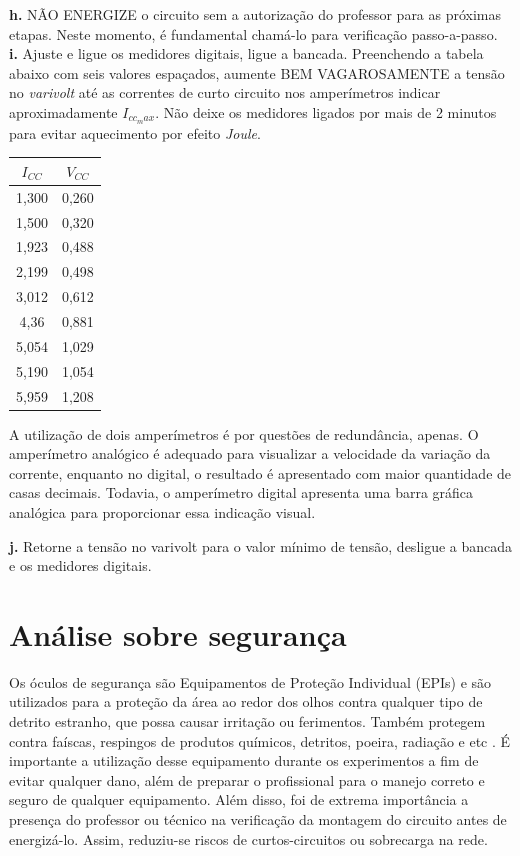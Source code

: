 \documentclass[a4paper,12pt,oneside,openany,table,xcdraw]{article}
\begin{document}
\noindent\textbf{h.} NÃO ENERGIZE o circuito sem a autorização do professor para as próximas etapas. Neste momento, é fundamental chamá-lo para verificação passo-a-passo. \\
\textbf{i.} Ajuste e ligue os medidores digitais, ligue a bancada. Preenchendo a tabela abaixo com seis valores espaçados, aumente BEM VAGAROSAMENTE a tensão no \textit{varivolt} até as correntes de curto circuito nos amperímetros indicar aproximadamente $I_{cc_max}$. Não deixe os medidores ligados por mais de 2 minutos para evitar aquecimento por efeito \textit{Joule}.  \\

\begin{table}[H]\scriptsize
\centering
\def\arraystretch{1.35}
\captionsetup{font=scriptsize}
 \label{tab2}
\begin{tabular}{|c|c|}
\hline
$I_{CC}$ & $V_{CC}$ \\ \hline
1,300    & 0,260    \\ \hline
1,500    & 0,320    \\ \hline
1,923    & 0,488    \\ \hline
2,199    & 0,498    \\ \hline
3,012    & 0,612    \\ \hline
4,36     & 0,881    \\ \hline
5,054    & 1,029    \\ \hline
5,190    & 1,054    \\ \hline
5,959    & 1,208    \\ \hline
\end{tabular}
\end{table}

A utilização de dois amperímetros é por questões de redundância, apenas. O amperímetro analógico é adequado para visualizar a velocidade da variação da corrente, enquanto no digital, o resultado é apresentado com maior quantidade de casas decimais. Todavia, o amperímetro digital apresenta uma barra gráfica analógica para proporcionar essa indicação visual. 

\noindent\textbf{j.} Retorne a tensão no varivolt para o valor mínimo de tensão, desligue a bancada e os medidores digitais.\\

\section{Análise sobre segurança} %
Os óculos de segurança são Equipamentos de Proteção Individual (EPIs) e são utilizados para a proteção da área ao redor dos olhos contra qualquer tipo de detrito estranho, que possa causar irritação ou ferimentos. Também protegem contra faíscas, respingos de produtos químicos, detritos, poeira, radiação e etc \cite{safe}.
É importante a utilização desse equipamento durante os experimentos a fim de evitar qualquer dano, além de preparar o profissional para o manejo correto e seguro de qualquer equipamento.
Além disso, foi de extrema importância a presença do professor ou técnico na verificação da montagem do circuito antes de energizá-lo. Assim, reduziu-se riscos de curtos-circuitos ou sobrecarga na rede.
\end{document}
